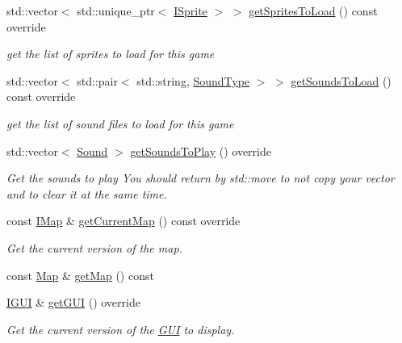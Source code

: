 \begin{DoxyCompactItemize}
std\+::vector$<$ std\+::unique\+\_\+ptr$<$ \hyperlink{classarcade_1_1_i_sprite}{I\+Sprite} $>$ $>$ \hyperlink{classarcade_1_1_solar_fox_game_afa9d714001212c869f616bd265dd9371}{get\+Sprites\+To\+Load} () const override
\begin{DoxyCompactList}\small\item\em get the list of sprites to load for this game \end{DoxyCompactList}\item 
std\+::vector$<$ std\+::pair$<$ std\+::string, \hyperlink{namespacearcade_a3bb4743a2eea59f3927e404e6549cae5}{Sound\+Type} $>$ $>$ \hyperlink{classarcade_1_1_solar_fox_game_aed75a8fdc63d9162359ada5332b44331}{get\+Sounds\+To\+Load} () const override
\begin{DoxyCompactList}\small\item\em get the list of sound files to load for this game \end{DoxyCompactList}\item 
std\+::vector$<$ \hyperlink{structarcade_1_1_sound}{Sound} $>$ \hyperlink{classarcade_1_1_solar_fox_game_a96f41df94a733d0c06f8a7d48e620d58}{get\+Sounds\+To\+Play} () override
\begin{DoxyCompactList}\small\item\em Get the sounds to play You should return by std\+::move to not copy your vector and to clear it at the same time. \end{DoxyCompactList}\item 
const \hyperlink{classarcade_1_1_i_map}{I\+Map} \& \hyperlink{classarcade_1_1_solar_fox_game_a8bb422466d4367320e90c6f9c6b754ed}{get\+Current\+Map} () const override
\begin{DoxyCompactList}\small\item\em Get the current version of the map. \end{DoxyCompactList}\item 
const \hyperlink{classarcade_1_1_map}{Map} \& \hyperlink{classarcade_1_1_solar_fox_game_a89c8912a012a8283f8509e243c4d5b0b}{get\+Map} () const
\item 
\hyperlink{classarcade_1_1_i_g_u_i}{I\+G\+UI} \& \hyperlink{classarcade_1_1_solar_fox_game_aba8a5d93b17231c5d2cbbb51cc1d05b9}{get\+G\+UI} () override
\begin{DoxyCompactList}\small\item\em Get the current version of the \hyperlink{classarcade_1_1_g_u_i}{G\+UI} to display. \end{DoxyCompactList}\item 

\end{DoxyCompactItemize}
